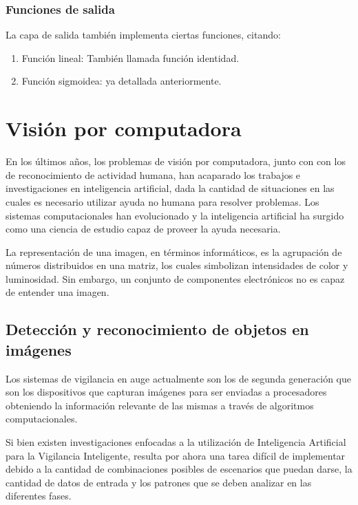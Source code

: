 \documentclass[a4paper,12pt,oneside,spanish]{book}
\begin{document}
\subsubsection{Funciones de salida}
La capa de salida también implementa ciertas funciones, citando:\par

\begin{enumerate}[noitemsep]
	\item Función lineal: También llamada función identidad. 
	\item Función sigmoidea: ya detallada anteriormente. 
\end{enumerate}

\section{Visión por computadora}\label{visionporcomputadora}

En los últimos años, los problemas de visión por computadora, junto con con los de reconocimiento de actividad humana, han acaparado los trabajos e investigaciones en inteligencia artificial, dada la cantidad de situaciones en las cuales es necesario utilizar ayuda no humana para resolver problemas. Los sistemas computacionales han evolucionado y la inteligencia artificial ha surgido como una ciencia de estudio capaz de proveer la ayuda necesaria. \par

La representación de una imagen, en términos informáticos, es la agrupación de números distribuidos en una matriz, los cuales simbolizan intensidades de color y luminosidad. Sin embargo, un conjunto de componentes electrónicos no es capaz de entender una imagen.\par

\subsection{Detección y reconocimiento de objetos en imágenes}

Los sistemas de vigilancia en auge actualmente son los de segunda generación que son los dispositivos que capturan imágenes para ser  enviadas a procesadores obteniendo la información relevante de las mismas a través de algoritmos computacionales. \par

Si bien existen investigaciones enfocadas a la utilización de Inteligencia Artificial para la Vigilancia Inteligente, resulta por ahora una tarea difícil de implementar debido a la cantidad de combinaciones posibles de escenarios que puedan darse, la cantidad de datos de entrada y los patrones que se deben analizar en las diferentes fases. \par
\end{document}
